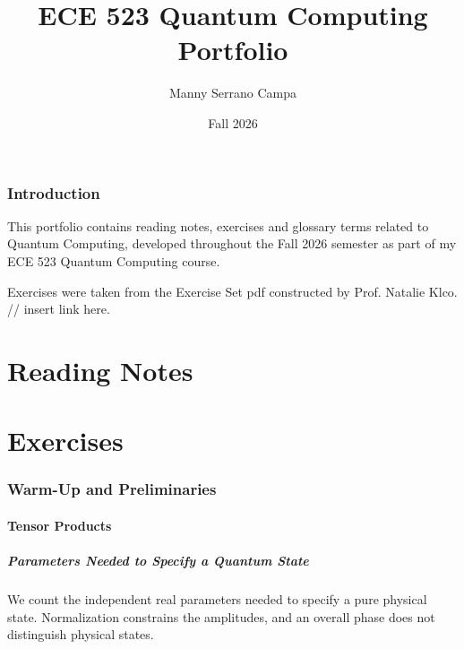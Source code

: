 \documentclass[11pt]{article}
\title{ECE 523 Quantum Computing Portfolio}
\author{Manny Serrano Campa}
\date{Fall 2026}
\begin{document}
\maketitle
\tableofcontents
\newpage

\section*{Introduction}

This portfolio contains reading notes, exercises and glossary terms related to Quantum Computing, developed throughout the Fall 2026 semester as part of my ECE 523 Quantum Computing course. 

Exercises were taken from the Exercise Set pdf constructed by Prof. Natalie Klco. // insert link here. 



\part{Reading Notes}


\part{Exercises}

\setcounter{section}{0}
\renewcommand{\thesection}{\Roman{section}}
\renewcommand{\thesubsection}{\Alph{subsection}}
\renewcommand{\thesubsubsection}
    {\thesection.\thesubsection.\arabic{subsubsection}}

\section{Warm-Up and Preliminaries}

\subsection{Tensor Products}

\subsubsection{Parameters Needed to Specify a Quantum State}
\label{ex:state-parameters}

We count the independent real parameters needed to specify a
pure physical state. Normalization constrains the amplitudes,
and an overall phase does not distinguish physical states.
\end{document}
